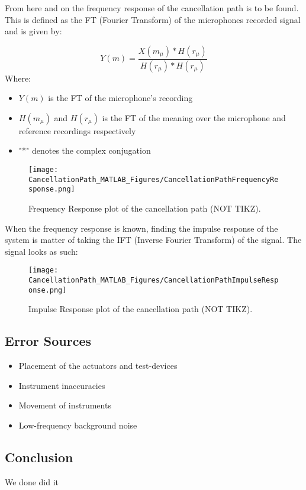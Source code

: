 From here and on the frequency response of the cancellation path is to be found. This is defined as the FT (Fourier Transform) of the microphones recorded signal and is given by:

\begin{equation}
\label{FrequencyResponseEq}
Y(m) = \frac{X(m_{\mu}) *  H(r_{\mu})}{H(r_{\mu}) *  H(r_{\mu})}
\end{equation}
Where:
\begin{itemize}
	\item $Y(m)$ is the FT of the microphone's recording
	\item $H(m_{\mu})$ and $H(r_{\mu})$ is the FT of the meaning over the microphone and reference recordings respectively
	\item "*" denotes the complex conjugation
\end{itemize}

\begin{figure}[H]
	\centering
	\texttt{[image: CancellationPath\_MATLAB\_Figures/CancellationPathFrequencyResponse.png]}
	\caption{Frequency Response plot of the cancellation path (NOT TIKZ).}
	\label{FrequencyResponsePlotCancellationPath}
\end{figure}

When the frequency response is known, finding the impulse response of the system is matter of taking the IFT (Inverse Fourier Transform) of the signal.
The signal looks as such:

\begin{figure}[H]
	\centering
	\texttt{[image: CancellationPath\_MATLAB\_Figures/CancellationPathImpulseResponse.png]}
	\caption{Impulse Response plot of the cancellation path (NOT TIKZ).}
	\label{CancellationPathImpulseResponse}
\end{figure}

\subsection{Error Sources}
\begin{itemize}
	\item Placement of the actuators and test-devices
	\item Instrument inaccuracies 
	\item Movement of instruments
	\item Low-frequency background noise
\end{itemize}

\subsection{Conclusion}
We done did it